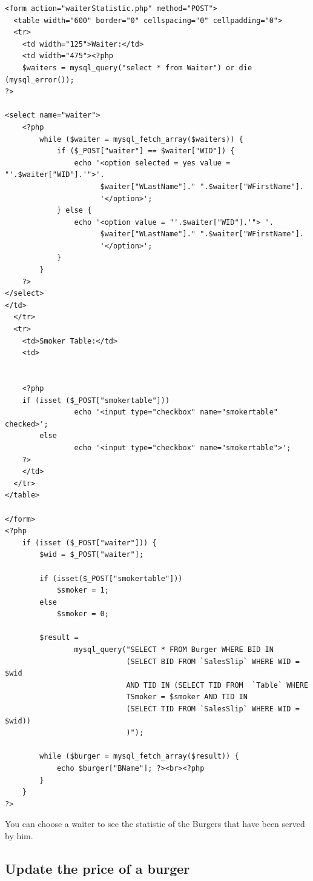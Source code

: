 \documentclass[10pt, a4paper]{article}
\begin{document}
\begin{lstlisting}[caption=waiterStatistic.php]
<form action="waiterStatistic.php" method="POST">
  <table width="600" border="0" cellspacing="0" cellpadding="0">
  <tr>
    <td width="125">Waiter:</td>
    <td width="475"><?php        
    $waiters = mysql_query("select * from Waiter") or die (mysql_error());
?>
    
<select name="waiter">            
    <?php
        while ($waiter = mysql_fetch_array($waiters)) {
            if ($_POST["waiter"] == $waiter["WID"]) {
                echo '<option selected = yes value = "'.$waiter["WID"].'">'. 
                      $waiter["WLastName"]." ".$waiter["WFirstName"].
                      '</option>';
            } else {
                echo '<option value = "'.$waiter["WID"].'"> '. 
                      $waiter["WLastName"]." ".$waiter["WFirstName"].
                      '</option>';
            }
        }
    ?>
</select>
</td>
  </tr>
  <tr>
    <td>Smoker Table:</td>
    <td>
    
    
    <?php
   	if (isset ($_POST["smokertable"]))
        		echo '<input type="checkbox" name="smokertable" checked>';
    	else
        		echo '<input type="checkbox" name="smokertable">';
    ?>
    </td>
  </tr>
</table>

</form>
<?php
    if (isset ($_POST["waiter"])) {
        $wid = $_POST["waiter"];
        
        if (isset($_POST["smokertable"])) 
            $smoker = 1;
        else
            $smoker = 0;
            
        $result = 
        		mysql_query("SELECT * FROM Burger WHERE BID IN 
                   			(SELECT BID FROM `SalesSlip` WHERE WID = $wid 
							AND TID IN (SELECT TID FROM  `Table` WHERE 
							TSmoker = $smoker AND TID IN 
                           	(SELECT TID FROM `SalesSlip` WHERE WID = $wid))
							)");
                   
        while ($burger = mysql_fetch_array($result)) {
            echo $burger["BName"]; ?><br><?php
        }        
    }
?>
\end{lstlisting}
You can choose a waiter to see the statistic of the Burgers that have been served by him.

\subsection{Update the price of a burger}
\end{document}
